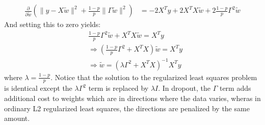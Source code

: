 \documentclass[paper=a4, fontsize=11pt]{scrartcl} %
\numberwithin{equation}{section} %
\numberwithin{figure}{section} %
\numberwithin{table}{section} %
\newcommand{\dP}[2]{\frac{\partial #1}{\partial #2}}
\begin{document}
\begin{enumerate}[(a)]
	\begin{align*}
		\dP{}{\tilde{w}}\left( \| y-X\tilde{w}\|^2 + \frac{1-p}{p} \|\Gamma \tilde{w}\|^2\right) &= -2X^Ty + 2X^TX\tilde{w} + 2\frac{1-p}{p}\Gamma^2\tilde{w}
	\end{align*}
	And setting this to zero yields:
	\begin{align*}
		&\frac{1-p}{p}\Gamma^2\tilde{w} + X^TX\tilde{w} =  X^Ty\\
		&\Rightarrow  \left(\frac{1-p}{p}\Gamma^2 + X^TX\right)\tilde{w} = X^Ty\\
		&\Rightarrow \tilde{w} = \left(\lambda\Gamma^2 + X^TX\right)^{-1}X^Ty
	\end{align*}
	where $\lambda=\frac{1-p}{p}$. Notice that the solution to the regularized least squares problem is identical except the $\lambda\Gamma^2$ term is replaced by $\lambda I$. In dropout, the $\Gamma$ term adds additional cost to weights which are in directions where the data varies, wheras in ordinary L2 regularized least squares, the directions are penalized by the same amount.
	
\end{enumerate}

\newpage



\end{document}
